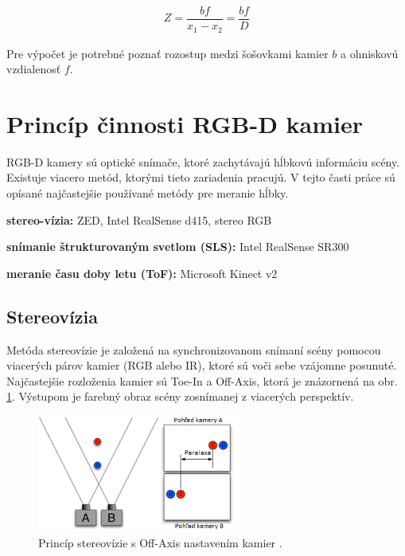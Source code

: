 \begin{equation}
\label{eq:depth}
\begin{aligned}
Z=\dfrac{bf}{x_1-x_2}=\dfrac{bf}{D}
\end{aligned}
\end{equation}

Pre výpočet je potrebné poznať rozostup medzi šošovkami kamier $b$ a ohniskovú vzdialenosť $f$. 

\newpage
\section{Princíp činnosti RGB-D kamier}
\label{sec:rgbd:principles}
RGB-D kamery sú optické snímače, ktoré zachytávajú hĺbkovú informáciu scény. Existuje viacero metód, ktorými tieto zariadenia pracujú. V tejto časti práce sú opísané najčastejšie používané metódy pre meranie hĺbky. \newline 

\begin{compactitem}
	\item \textbf{stereo-vízia:} ZED, Intel RealSense d415, stereo RGB
	\item \textbf{snímanie štrukturovaným svetlom (SLS):} Intel RealSense SR300 
	\item \textbf{meranie času doby letu (ToF):} Microsoft Kinect v2 
\end{compactitem}

\subsection{Stereovízia}

Metóda stereovízie je založená na synchronizovanom snímaní scény pomocou viacerých párov kamier (RGB alebo IR), ktoré sú voči sebe vzájomne posunuté. Najčastejšie rozloženia kamier sú Toe-In a Off-Axis, ktorá je znázornená na obr. \ref{fig:stereovizia}. Výstupom je farebný obraz scény zosnímanej z viacerých perspektív.

\begin{figure}[h]
	\centering
	\includegraphics[width=0.6\textwidth]{figures/stereovizia.png} 
	\caption{Princíp stereovízie s Off-Axis nastavením kamier \cite{stereo}.}
	\label{fig:stereovizia}
\end{figure}

